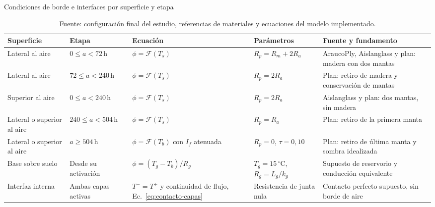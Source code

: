 \begin{table}[htbp]
  \centering
  \caption{Condiciones de borde e interfaces por superficie y etapa}
  \label{tab:bordes-etapas}
  \small
  \setlength{\tabcolsep}{3pt}
  \begin{tabular}{L{2.5cm}L{2.0cm}L{3.7cm}L{3.0cm}L{4.5cm}}
    \toprule
    Superficie & Etapa & Ecuación & Parámetros & Fuente y fundamento \\
    \midrule
    Lateral al aire & $0\leq a<72\,\mathrm h$ & $\phi=\mathcal F(T_s)$ & $R_p=R_m+2R_a$ & AraucoPly, Aislanglass y plan: madera con dos mantas \\
    Lateral al aire & $72\leq a<240\,\mathrm h$ & $\phi=\mathcal F(T_s)$ & $R_p=2R_a$ & Plan: retiro de madera y conservación de mantas \\
    Superior al aire & $0\leq a<240\,\mathrm h$ & $\phi=\mathcal F(T_s)$ & $R_p=2R_a$ & Aislanglass y plan: dos mantas, sin madera \\
    Lateral o superior al aire & $240\leq a<504\,\mathrm h$ & $\phi=\mathcal F(T_s)$ & $R_p=R_a$ & Plan: retiro de la primera manta \\
    Lateral o superior al aire & $a\geq504\,\mathrm h$ & $\phi=\mathcal F(T_b)$ con $I_f$ atenuada & $R_p=0$, $\tau=0{,}10$ & Plan: retiro de última manta y sombra idealizada \\
    Base sobre suelo & Desde su activación & $\phi=(T_g-T_b)/R_g$ & $T_g=15\,^{\circ}\mathrm C$, $R_g=L_g/k_g$ & Supuesto de reservorio y conducción equivalente \\
    Interfaz interna & Ambas capas activas & $T^-=T^+$ y continuidad de flujo, Ec.~\eqref{eq:contacto-capas} & Resistencia de junta nula & Contacto perfecto supuesto, sin borde de aire \\
    \bottomrule
  \end{tabular}
  \captionsetup{skip=2pt}
  \caption*{Fuente: configuración final del estudio, referencias de materiales y ecuaciones del modelo implementado.}
\end{table}
